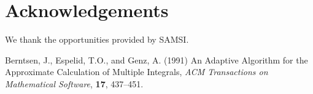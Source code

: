 \documentclass[11pt,twoside]{article}
\numberwithin{equation}{section}
\begin{document}
\section*{Acknowledgements}
We thank the opportunities provided by SAMSI. 

\begin{thebibliography}{}
Berntsen, J., Espelid, T.O., and Genz, A. (1991) An Adaptive Algorithm for the Approximate Calculation 
of Multiple Integrals, {\it ACM Transactions on Mathematical Software}, {\bf 17}, 437--451.
\end{thebibliography}
\end{document}

